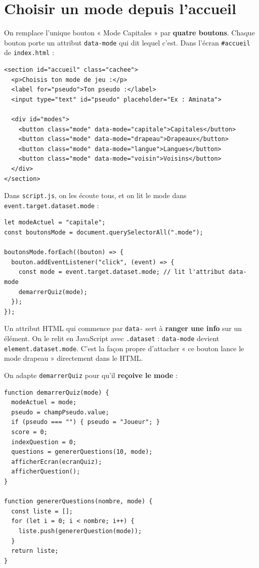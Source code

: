 \documentclass[11pt,a4paper]{article}
\newcommand{\code}[1]{\texttt{#1}}
\begin{document}
\section{Choisir un mode depuis l'accueil}

On remplace l'unique bouton « Mode Capitales » par \textbf{quatre boutons}. Chaque bouton porte un attribut \code{data-mode} qui dit lequel c'est. Dans l'écran \code{\#accueil} de \code{index.html} :

\begin{lstlisting}[style=html]
<section id="accueil" class="cachee">
  <p>Choisis ton mode de jeu :</p>
  <label for="pseudo">Ton pseudo :</label>
  <input type="text" id="pseudo" placeholder="Ex : Aminata">

  <div id="modes">
    <button class="mode" data-mode="capitale">Capitales</button>
    <button class="mode" data-mode="drapeau">Drapeaux</button>
    <button class="mode" data-mode="langue">Langues</button>
    <button class="mode" data-mode="voisin">Voisins</button>
  </div>
</section>
\end{lstlisting}

Dans \code{script.js}, on les écoute tous, et on lit le mode dans \code{event.target.dataset.mode} :

\begin{lstlisting}[style=js]
let modeActuel = "capitale";
const boutonsMode = document.querySelectorAll(".mode");

boutonsMode.forEach((bouton) => {
  bouton.addEventListener("click", (event) => {
    const mode = event.target.dataset.mode; // lit l'attribut data-mode
    demarrerQuiz(mode);
  });
});
\end{lstlisting}

\begin{infobox}
Un attribut HTML qui commence par \code{data-} sert à \textbf{ranger une info} sur un élément. On le relit en JavaScript avec \code{.dataset} : \code{data-mode} devient \code{element.dataset.mode}. C'est la façon propre d'attacher « ce bouton lance le mode drapeau » directement dans le HTML.
\end{infobox}

On adapte \code{demarrerQuiz} pour qu'il \textbf{reçoive le mode} :

\begin{lstlisting}[style=js]
function demarrerQuiz(mode) {
  modeActuel = mode;
  pseudo = champPseudo.value;
  if (pseudo === "") { pseudo = "Joueur"; }
  score = 0;
  indexQuestion = 0;
  questions = genererQuestions(10, mode);
  afficherEcran(ecranQuiz);
  afficherQuestion();
}

function genererQuestions(nombre, mode) {
  const liste = [];
  for (let i = 0; i < nombre; i++) {
    liste.push(genererQuestion(mode));
  }
  return liste;
}
\end{lstlisting}
\end{document}
